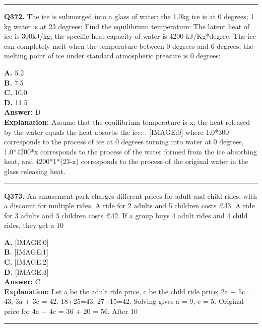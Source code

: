 \documentclass[12pt]{article}
\begin{document}
\hrule
\vspace{1em}


\noindent
\textbf{Q372.} The ice is submerged into a glass of water; the 1.0kg ice is at 0 degrees; 1 kg water is at 23 degrees; Find the equilibrium temperature: The latent heat of ice is 300kJ/kg; the specific heat capacity of water is 4200 kJ/Kg*degree; The ice can completely melt when the temperature between 0 degrees and 6 degrees; the melting point of ice under standard atmospheric pressure is 0 degrees:



\textbf{A.} 5.2 \\
\textbf{B.} 7.5 \\
\textbf{C.} 10.0 \\
\textbf{D.} 11.5 \\

\textbf{Answer:} D \\
\textbf{Explanation:} Assume that the equilibrium temperature is x; the heat released by the water equals the heat absorbs the ice:
.
[IMAGE:0]
where 1.0*300
corresponds to the process of ice at 0 degrees turning into water at 0 degrees, 1.0*4200*x
corresponds to the process of the water formed from the ice absorbing heat, and 4200*1*(23-x)
corresponds to the process of the original water in the glass releasing heat.

\hrule
\vspace{1em}


\noindent
\textbf{Q373.} An amusement park charges different prices for adult and child rides, with a discount for multiple rides.
A ride for 2 adults and 5 children costs £43.
A ride for 3 adults and 3 children costs £42.
If a group buys 4 adult rides and 4 child rides, they get a 10%



\textbf{A.} [IMAGE:0] \\
\textbf{B.} [IMAGE:1] \\
\textbf{C.} [IMAGE:2] \\
\textbf{D.} [IMAGE:3] \\

\textbf{Answer:} C \\
\textbf{Explanation:} Let a be the adult ride price, c be the child ride price;
2a + 5c = 43; 3a + 3c = 42.
18+25=43; 27+15=42.
Solving gives a = 9, c = 5.
Original price for 4a + 4c = 36 + 20 = 56.
After 10%

\hrule
\vspace{1em}
\end{document}
